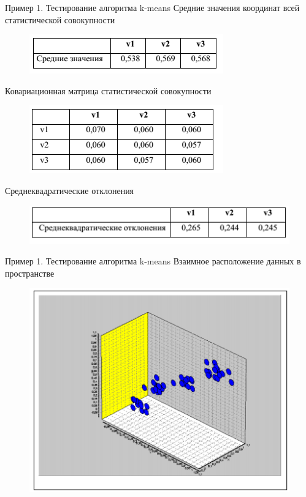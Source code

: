 \documentclass{beamer}
\begin{document}
\begin{frame}{Пример 1. Тестирование алгоритма k-means}
Средние значения координат всей статистической совокупности
\begin{figure}[h]
\centering
\includegraphics[scale=0.6]{images/lec07-pic33.png}
\end{figure}
Ковариационная матрица статистической совокупности
\begin{figure}[h]
\centering
\includegraphics[scale=0.6]{images/lec07-pic34.png}
\end{figure}
Среднеквадратические отклонения 
\begin{figure}[h]
\centering
\includegraphics[scale=0.6]{images/lec07-pic35.png}
\end{figure}
\end{frame}

\begin{frame}{Пример 1. Тестирование алгоритма k-means}
Взаимное расположение данных в пространстве
\begin{figure}[h]
\centering
\includegraphics[scale=0.7]{images/lec07-pic36.png}
\end{figure}
\end{frame}
\end{document}
